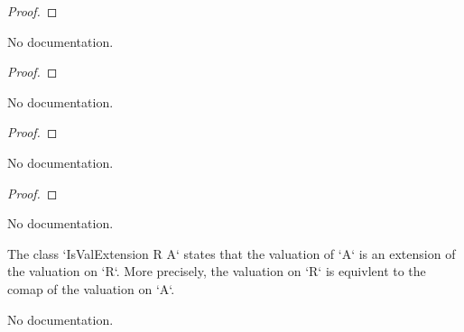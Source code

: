 \begin{proof}
    \leanok
\end{proof}

\begin{theorem}\label{IsValExtension.val_map_eq_iff}
        \leanok
                No documentation.
    \end{theorem}

\begin{proof}
    \leanok
\end{proof}

\begin{theorem}\label{IsValExtension.val_map_le_one_iff}
        \leanok
                No documentation.
    \end{theorem}

\begin{proof}
    \leanok
\end{proof}

\begin{theorem}\label{IsValExtension.val_map_lt_one_iff}
        \leanok
                No documentation.
    \end{theorem}

\begin{proof}
    \leanok
\end{proof}

\begin{theorem}\label{IsValExtension.val_map_eq_one_iff}
                No documentation.
    \end{theorem}

\begin{definition}\label{IsValExtension}
        \leanok
                The class `IsValExtension R A` states that the valuation of `A` is an extension of the valuation
on `R`. More precisely, the valuation on `R` is equivlent to the comap of the valuation on `A`.
    \end{definition}

\begin{definition}\label{IsValExtension.ofIntegerComap}
        \leanok
                No documentation.
    \end{definition}

